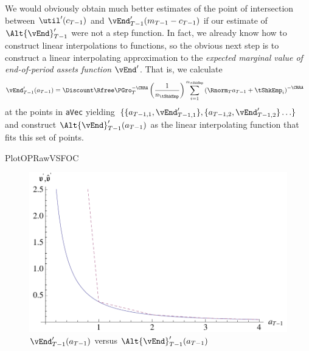 \documentclass[titlepage]{\econtex}
\begin{document}
We would obviously obtain much better estimates of the point of
intersection between $\util^{\prime}({c}_{T-1})$ and
$\vEnd_{T-1}^{\prime}({m}_{T-1}-{c}_{T-1})$ if our estimate of
$\Alt{\vEnd}^{\prime}_{T-1}$ were not a step function.  In
fact, we already know how to construct linear interpolations
to functions, so the obvious next step is to construct a
linear interpolating approximation to the \textit{expected marginal
  value of end-of-period assets function} $\vEnd^{\prime}$. That is, we calculate
\begin{equation}\begin{gathered}\begin{aligned}
  \vEnd_{T-1}^{\prime}({a}_{T-1})  & =  \Discount \Rfree \PGro_{T}^{-\CRRA} \left(\frac{1}{n_{\tShkEmp}}\right) \sum_{i=1}^{n_{\tShkEmp}} \left(\Rnorm_{T} {a}_{T-1} + \tShkEmp_{i}\right)^{-\CRRA} \label{eq:vEndPrimeTm1}
\end{aligned}\end{gathered}\end{equation}
at the points in \texttt{aVec} yielding
$\{\{\null{a}_{T-1,1},\vEnd_{T-1,1}^{\prime}\},\{{a}_{T-1,2},\vEnd_{T-1,2}^{\prime}\}
\ldots\}$ and construct
$\Alt{\vEnd}_{T-1}^{\prime}({a}_{T-1})$ as the linear
interpolating function that fits this set of points.

\hypertarget{}{PlotOPRawVSFOC}{}
\begin{figure}
  \includegraphics{./Figures/PlotOPRawVSFOC}
  \caption{$\vEnd_{T-1}^{\prime}({a}_{T-1})$ versus $\Alt{\vEnd}_{T-1}^{\prime}({a}_{T-1})$}
  \label{fig:PlotOPRawVSFOC}
\end{figure}
\end{document}
